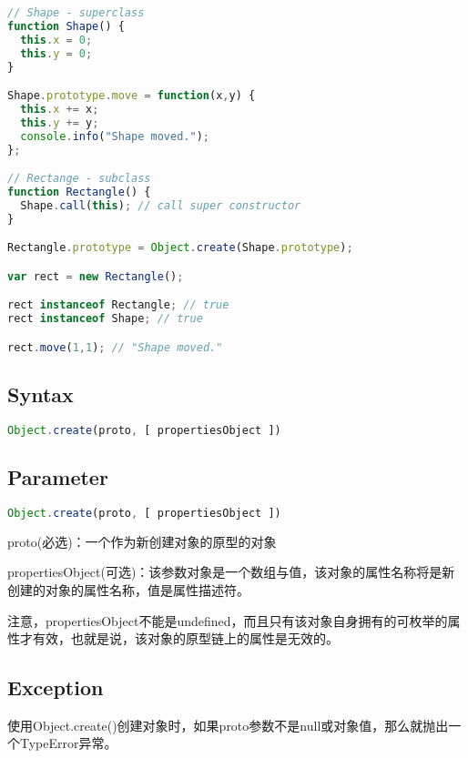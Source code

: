 \begin{lstlisting}[language=JavaScript]
// Shape - superclass
function Shape() {
  this.x = 0;
  this.y = 0;
}

Shape.prototype.move = function(x,y) {
  this.x += x;
  this.y += y;
  console.info("Shape moved.");
};

// Rectange - subclass
function Rectangle() {
  Shape.call(this); // call super constructor
}

Rectangle.prototype = Object.create(Shape.prototype);

var rect = new Rectangle();

rect instanceof Rectangle; // true
rect instanceof Shape; // true

rect.move(1,1); // "Shape moved."
\end{lstlisting}


\subsection{Syntax}


\begin{lstlisting}[language=JavaScript]
Object.create(proto, [ propertiesObject ])
\end{lstlisting}


\subsection{Parameter}


\begin{lstlisting}[language=JavaScript]
Object.create(proto, [ propertiesObject ])
\end{lstlisting}


\begin{compactitem}
\item proto(必选)：一个作为新创建对象的原型的对象
\item propertiesObject(可选)：该参数对象是一个数组与值，该对象的属性名称将是新创建的对象的属性名称，值是属性描述符。
\end{compactitem}

注意，propertiesObject不能是undefined，而且只有该对象自身拥有的可枚举的属性才有效，也就是说，该对象的原型链上的属性是无效的。

\subsection{Exception}

使用Object.create()创建对象时，如果proto参数不是null或对象值，那么就抛出一个TypeError异常。



